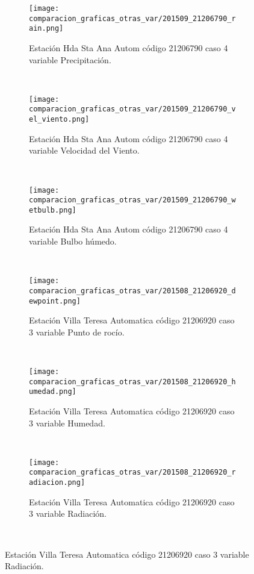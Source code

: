 \begin{figure}[H]
\centering
\begin{subfigure}[normla]{0.4\textwidth}
\caption{Estación Hda Sta Ana Autom código 21206790 caso 4 variable Precipitación.}
\texttt{[image: comparacion\_graficas\_otras\_var/201509\_21206790\_rain.png]}
\end{subfigure}
~
\begin{subfigure}[normla]{0.4\textwidth}
\caption{Estación Hda Sta Ana Autom código 21206790 caso 4 variable Velocidad del Viento.}
\texttt{[image: comparacion\_graficas\_otras\_var/201509\_21206790\_vel\_viento.png]}
\end{subfigure}
~
\begin{subfigure}[normla]{0.4\textwidth}
\caption{Estación Hda Sta Ana Autom código 21206790 caso 4 variable Bulbo húmedo.}
\texttt{[image: comparacion\_graficas\_otras\_var/201509\_21206790\_wetbulb.png]}
\end{subfigure}
~
\begin{subfigure}[normla]{0.4\textwidth}
\caption{Estación Villa Teresa Automatica código 21206920 caso 3 variable Punto de rocío.}
\texttt{[image: comparacion\_graficas\_otras\_var/201508\_21206920\_dewpoint.png]}
\end{subfigure}
~
\begin{subfigure}[normla]{0.4\textwidth}
\caption{Estación Villa Teresa Automatica código 21206920 caso 3 variable Humedad.}
\texttt{[image: comparacion\_graficas\_otras\_var/201508\_21206920\_humedad.png]}
\end{subfigure}
~
\begin{subfigure}[normla]{0.4\textwidth}
\caption{Estación Villa Teresa Automatica código 21206920 caso 3 variable Radiación.}
\texttt{[image: comparacion\_graficas\_otras\_var/201508\_21206920\_radiacion.png]}
\end{subfigure}
~
\end{figure}
           
